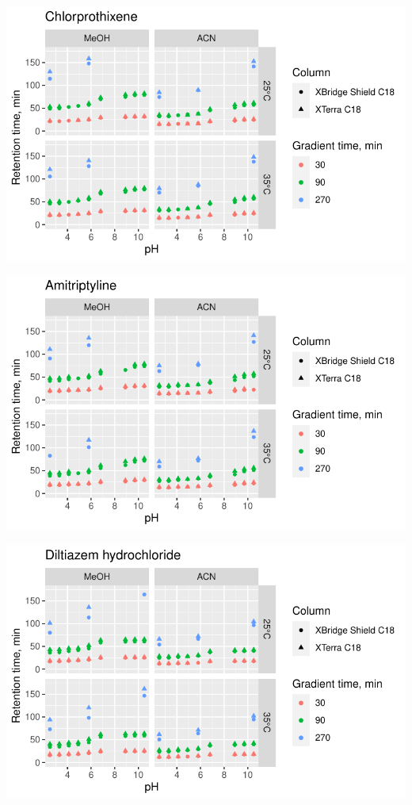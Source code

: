 \documentclass[
  letterpaper,
  DIV=11,
  numbers=noendperiod]{scrreprt}
\begin{document}
\includegraphics{index_files/figure-pdf/unnamed-chunk-4-33.pdf}

\includegraphics{index_files/figure-pdf/unnamed-chunk-4-34.pdf}

\includegraphics{index_files/figure-pdf/unnamed-chunk-4-35.pdf}
\end{document}
